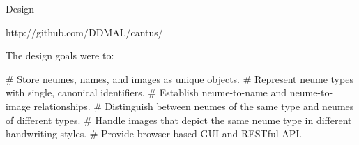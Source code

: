 \documentclass[final]{beamer}
\newlength{\onecolwid}
\begin{document}
\begin{frame}[fragile,t]
\vspace{2cm}

\begin{columns}
\begin{column}{\onecolwid}
\begin{block}{Design}
\begin{center}
\vspace{-0.25\baselineskip}
\small{http://github.com/DDMAL/cantus/}
\normalsize
\vspace{0.25\baselineskip}
\end{center}

\raggedright

The design goals were to:

\begin{easylist}[itemize]
# Store neumes, names, and images as unique objects.
# Represent neume types with single, canonical identifiers.
# Establish neume-to-name and neume-to-image relationships.
# Distinguish between neumes of the same type and neumes of different types.
# Handle images that depict the same neume type in different handwriting styles.
# Provide browser-based GUI and RESTful API.
\end{easylist}



\end{block}
\end{column}
\end{columns}
\end{frame}
\end{document}
